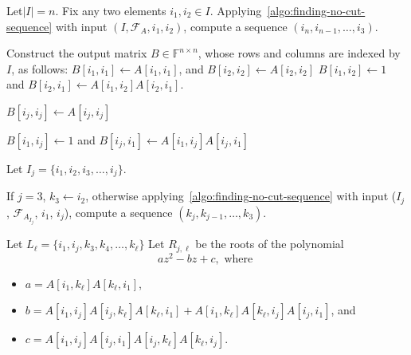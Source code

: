 \documentclass[11pt,letterpaper]{article}
\newcommand{\F}{\mathbb{F}}
\newcommand{\submatrixfamily}[1]{\mathcal{F}_{#1}}
\begin{document}
{{{\begin{algorithm}
\begin{algorithmic}[1]
\State Let$|I|=n$. Fix any two elements $i_1, i_2\in I$. \label{algo:reconstruction-with-no-cut-&-Q-fixing-indices}
\State Applying~\cref{algo:finding-no-cut-sequence} with input $(I, \submatrixfamily{A}, i_1, i_2)$, compute a sequence $(i_n,i_{n-1}, \ldots, i_{3})$. \label{algo:reconstruction-with-no-cut-&-Q-first-no-cut-sequence}

\State Construct the output matrix $B\in\F^{n\times n}$, whose rows and columns are indexed by $I$, as follows: 
\State $B[i_1,i_1] \leftarrow A[i_1,i_1]$, and $B[i_2,i_2] \leftarrow A[i_2,i_2]$
\State $B[i_1, i_2]\leftarrow 1$ and $B[i_2, i_1]\leftarrow A[i_1, i_2]A[i_2, i_1]$. 

 \label{algo:reconstruction-with-no-cut-&-Q-first-loop}

\State $B[i_j,i_j]\leftarrow A[i_j, i_j]$

\State $B[i_1, i_j]\leftarrow 1$ and $B[i_j, i_1]\leftarrow A[i_1, i_j]A[i_j, i_1]$\label{algo:reconstruction-with-no-cut-&-Q-first-loop-first-row-entries}

\State Let $I_j=\{i_1, i_2, i_3,\ldots, i_j\}$. 

\State If $j=3$, $k_3\leftarrow i_2$, otherwise applying~\cref{algo:finding-no-cut-sequence} with input ($I_j$, $\submatrixfamily{A_{I_j}}$, $i_1$, $i_j$), \label{algo:reconstruction-with-no-cut-&-Q-second-no-cut-sequence}
\State \hspace{0.5 cm} compute a sequence $(k_j, k_{j-1}, \ldots, k_3)$.

\label{algo:reconstruction-with-no-cut-&-Q-second-loop}
\State Let $L_{\ell}=\{i_1, i_j, k_3, k_4, \ldots, k_\ell\}$
\State Let $R_{j, \ell}$ be the roots of the polynomial 
\vspace{-1em}
\begin{equation}
\label{eqn:reconstruction-with-no-cut-&-Q-one}
az^2-bz+c, \text{ where }   
\end{equation}\label{algo:reconstruction-with-no-cut-&-Q-root-set}
\vspace{-2em}
\begin{itemize}[leftmargin=3cm]
\item $a=A[i_1, k_\ell]A[k_\ell, i_1]$, 
\item $b=A[i_1, i_j]A[i_j, k_\ell]A[k_\ell, i_1]+A[i_1, k_\ell]A[k_\ell, i_j]A[i_j, i_1]$, and  
\item $c=A[i_1, i_j]A[i_j, i_1]A[i_j, k_\ell]A[k_\ell, i_j].$
\end{itemize}


\end{algorithmic}
\end{algorithm}}}}
\end{document}
